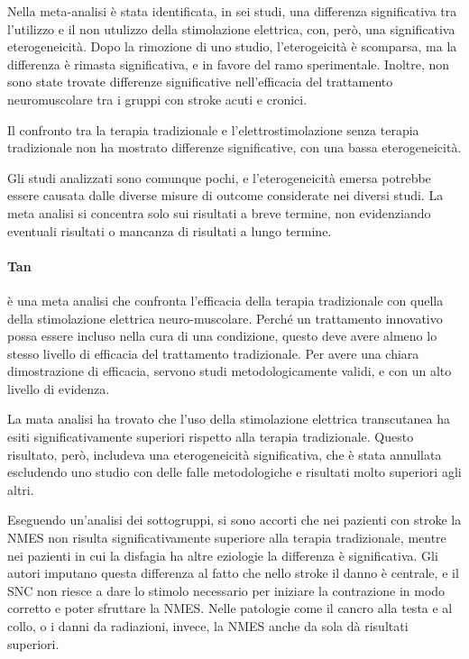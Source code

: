Nella meta-analisi è stata identificata, in sei studi, una differenza 
significativa tra l'utilizzo e il non utulizzo della stimolazione elettrica, 
con, però, una significativa eterogeneicità.
Dopo la rimozione di uno studio, l'eterogeicità è scomparsa, ma la differenza è 
rimasta significativa, e in favore del ramo sperimentale.
Inoltre, non sono state trovate differenze significative nell'efficacia del 
trattamento neuromuscolare tra i gruppi con stroke acuti e cronici.

Il confronto tra la terapia tradizionale e l'elettrostimolazione senza terapia 
tradizionale non ha mostrato differenze significative, con una bassa 
eterogeneicità.

Gli studi analizzati sono comunque pochi, e l'eterogeneicità emersa potrebbe 
essere causata dalle diverse misure di outcome considerate nei diversi studi.
La meta analisi si concentra solo sui risultati a breve termine, non 
evidenziando eventuali risultati o mancanza di risultati a lungo termine.

\paragraph{Tan} \label{par:tan} \cite{Tan2013} è una meta analisi che confronta 
l'efficacia della terapia tradizionale con quella della stimolazione elettrica 
neuro-muscolare.
Perché un trattamento innovativo possa essere incluso nella cura di una 
condizione, questo deve avere almeno lo stesso livello di efficacia del 
trattamento tradizionale.
Per avere una chiara dimostrazione di efficacia, servono studi 
metodologicamente validi, e con un alto livello di evidenza.

La mata analisi ha trovato che l'uso della stimolazione elettrica transcutanea 
ha esiti significativamente superiori rispetto alla terapia tradizionale.
Questo risultato, però, includeva una eterogeneicità significativa, che è stata 
annullata escludendo uno studio con delle falle metodologiche e risultati molto 
superiori agli altri.

Eseguendo un'analisi dei sottogruppi, si sono accorti che nei pazienti con 
stroke la NMES non risulta significativamente superiore alla terapia 
tradizionale, mentre nei pazienti in cui la disfagia ha altre eziologie la 
differenza è significativa.
Gli autori imputano questa differenza al fatto che nello stroke il danno è 
centrale, e il SNC non riesce a dare lo stimolo necessario per iniziare la 
contrazione in modo corretto e poter sfruttare la NMES.
Nelle patologie come il cancro alla testa e al collo, o i danni da radiazioni, 
invece, la NMES anche da sola dà risultati superiori.

